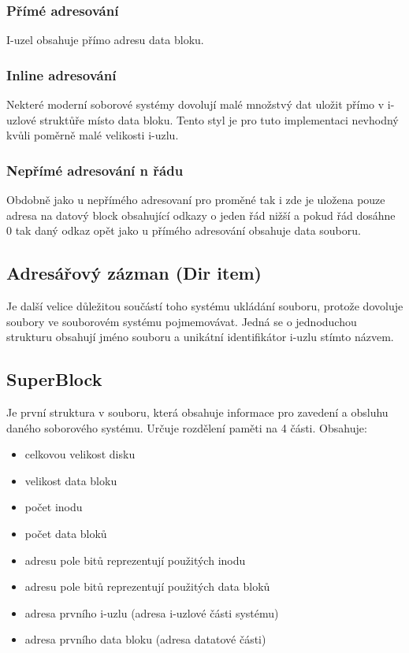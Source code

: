 \documentclass[12pt, a4paper]{report}
\begin{document}
\subsubsection{Přímé adresování}
I-uzel obsahuje přímo adresu data bloku.
\subsubsection{Inline adresování}
Nekteré moderní soborové systémy dovolují malé množstvý dat uložit přímo v i-uzlové struktůře místo data bloku. Tento styl je pro tuto implementaci nevhodný kvůli poměrně malé velikosti i-uzlu.
\subsubsection{Nepřímé adresování n řádu}
Obdobně jako u nepřímého adresovaní pro proměné tak i zde je uložena pouze adresa na datový block obsahující odkazy o jeden řád nižší a pokud řád dosáhne 0 tak daný odkaz opět jako u přímého adresování obsahuje data souboru.
\subsection{Adresářový zázman (Dir item)}
Je další velice důležitou součástí toho systému ukládání souboru, protože dovoluje soubory ve souborovém systému pojmemovávat. Jedná se o jednoduchou strukturu obsahují jméno souboru a unikátní identifikátor i-uzlu stímto názvem.
\subsection{SuperBlock}
Je první struktura v souboru, která obsahuje informace pro zavedení a obsluhu daného soborového systému. Určuje rozdělení paměti na 4 části.
\linebreak
Obsahuje:
\begin{itemize}
 \item celkovou velikost disku
 \item velikost data bloku
 \item počet inodu
 \item počet data bloků
 \item adresu pole bitů reprezentují použitých inodu
 \item adresu pole bitů reprezentují použitých data bloků
 \item adresa prvního i-uzlu (adresa i-uzlové části systému)
 \item adresa prvního data bloku (adresa datatové části)
\end{itemize}
\end{document}
